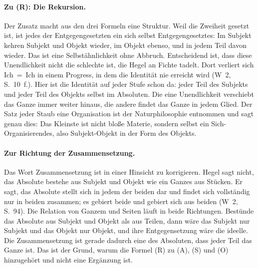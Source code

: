 \documentclass[11pt,a4paper]{article}
\newcommand{\SO}{Subjekt-Objekt}
\newcommand{\Werke}[1]{(W~2, S.~#1)}
\begin{document}
\paragraph{Zu (R): Die Rekursion.}
Der Zusatz macht aus den drei Formeln eine Struktur. Weil die Zweiheit gesetzt ist, ist \glqq jedes der Entgegengesetzten ein sich selbst Entgegengesetztes\grqq{}: Im Subjekt kehren Subjekt und Objekt wieder, im Objekt ebenso, und in jedem Teil davon wieder. Das ist eine Selbstähnlichkeit ohne Abbruch. Entscheidend ist, dass diese Unendlichkeit nicht die schlechte ist, die Hegel an Fichte tadelt. Dort verliert sich Ich~=~Ich in einem Progress, in dem die Identität nie erreicht wird \Werke{10~f.}. Hier ist die Identität auf jeder Stufe schon da: \glqq jeder Teil des Subjekts und jeder Teil des Objekts selbst im Absoluten\grqq{}. Die eine Unendlichkeit verschiebt das Ganze immer weiter hinaus, die andere findet das Ganze in jedem Glied. Der Satz \glqq jeder Staub eine Organisation\grqq{} ist der Naturphilosophie entnommen und sagt genau dies: Das Kleinste ist nicht bloße Materie, sondern selbst ein Sich-Organisierendes, also \SO{} in der Form des Objekts.

\paragraph{Zur Richtung der Zusammensetzung.}
Das Wort Zusammensetzung ist in einer Hinsicht zu korrigieren. Hegel sagt nicht, das Absolute bestehe aus Subjekt und Objekt wie ein Ganzes aus Stücken. Er sagt, das Absolute \glqq stellt sich in jedem der beiden dar\grqq{} und \glqq findet sich vollständig nur in beiden zusammen\grqq{}; es \glqq gebiert beide und gebiert sich aus beiden\grqq{} \Werke{94}. Die Relation von Ganzem und Seiten läuft in beide Richtungen. Bestünde das Absolute aus Subjekt und Objekt als aus Teilen, dann wäre das Subjekt nur Subjekt und das Objekt nur Objekt, und ihre Entgegensetzung wäre die ideelle. Die Zusammensetzung ist gerade dadurch eine des Absoluten, dass jeder Teil das Ganze ist. Das ist der Grund, warum die Formel (R) zu (A), (S) und (O) hinzugehört und nicht eine Ergänzung ist.
\end{document}
